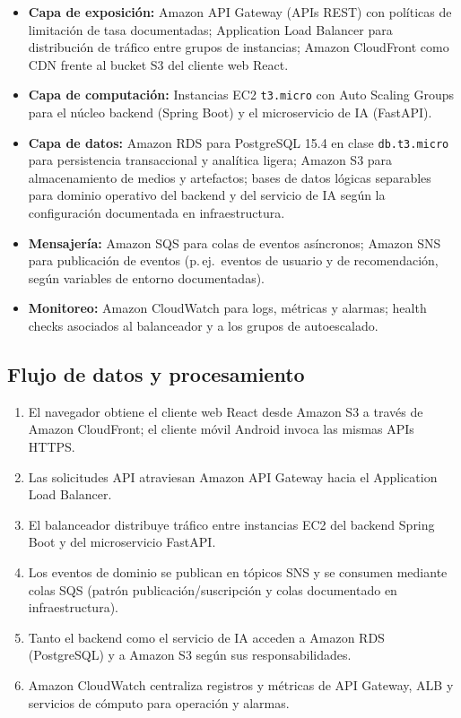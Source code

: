 \documentclass[12pt, letterpaper]{article}
\begin{document}
\begin{itemize}
\item \textbf{Capa de exposición:} Amazon API Gateway (APIs REST) con políticas de limitación de tasa documentadas; Application Load Balancer para distribución de tráfico entre grupos de instancias; Amazon CloudFront como CDN frente al bucket S3 del cliente web React.
\item \textbf{Capa de computación:} Instancias EC2 \texttt{t3.micro} con Auto Scaling Groups para el núcleo backend (Spring Boot) y el microservicio de IA (FastAPI).
\item \textbf{Capa de datos:} Amazon RDS para PostgreSQL 15.4 en clase \texttt{db.t3.micro} para persistencia transaccional y analítica ligera; Amazon S3 para almacenamiento de medios y artefactos; bases de datos lógicas separables para dominio operativo del backend y del servicio de IA según la configuración documentada en infraestructura.
\item \textbf{Mensajería:} Amazon SQS para colas de eventos asíncronos; Amazon SNS para publicación de eventos (p.\,ej.\ eventos de usuario y de recomendación, según variables de entorno documentadas).
\item \textbf{Monitoreo:} Amazon CloudWatch para logs, métricas y alarmas; health checks asociados al balanceador y a los grupos de autoescalado.
\end{itemize}

\subsection*{Flujo de datos y procesamiento}

\begin{enumerate}
\item El navegador obtiene el cliente web React desde Amazon S3 a través de Amazon CloudFront; el cliente móvil Android invoca las mismas APIs HTTPS.
\item Las solicitudes API atraviesan Amazon API Gateway hacia el Application Load Balancer.
\item El balanceador distribuye tráfico entre instancias EC2 del backend Spring Boot y del microservicio FastAPI.
\item Los eventos de dominio se publican en tópicos SNS y se consumen mediante colas SQS (patrón publicación/suscripción y colas documentado en infraestructura).
\item Tanto el backend como el servicio de IA acceden a Amazon RDS (PostgreSQL) y a Amazon S3 según sus responsabilidades.
\item Amazon CloudWatch centraliza registros y métricas de API Gateway, ALB y servicios de cómputo para operación y alarmas.
\end{enumerate}
\end{document}

